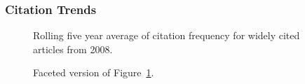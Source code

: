 \documentclass[
  10pt,
  letterpaper,
  DIV=11,
  numbers=noendperiod,
  twoside]{scrartcl}
\begin{document}
\subsubsection*{Citation Trends}\label{citation-trends-32}

\begin{figure}


\caption{\label{fig-citation-spaghetti-2008}Rolling five year average of
citation frequency for widely cited articles from 2008.}

\end{figure}%

\begin{figure}


\caption{\label{fig-citation-facet-2008}Faceted version of
Figure~\ref{fig-citation-spaghetti-2008}.}

\end{figure}%
\end{document}
